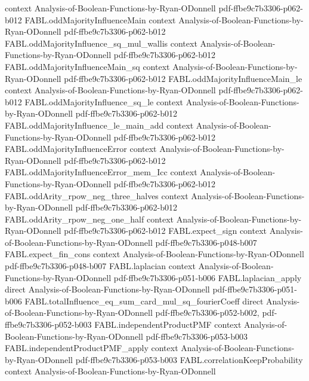 \begin{theorem}
  {context}
  {Analysis-of-Boolean-Functions-by-Ryan-ODonnell}
  {pdf-ffbe9c7b3306-p062-b012}
\proofstep
  {FABL.oddMajorityInfluenceMain}
  {context}
  {Analysis-of-Boolean-Functions-by-Ryan-ODonnell}
  {pdf-ffbe9c7b3306-p062-b012}
\proofstep
  {FABL.oddMajorityInfluence_sq_mul_wallis}
  {context}
  {Analysis-of-Boolean-Functions-by-Ryan-ODonnell}
  {pdf-ffbe9c7b3306-p062-b012}
\proofstep
  {FABL.oddMajorityInfluenceMain_sq}
  {context}
  {Analysis-of-Boolean-Functions-by-Ryan-ODonnell}
  {pdf-ffbe9c7b3306-p062-b012}
\proofstep
  {FABL.oddMajorityInfluenceMain_le}
  {context}
  {Analysis-of-Boolean-Functions-by-Ryan-ODonnell}
  {pdf-ffbe9c7b3306-p062-b012}
\proofstep
  {FABL.oddMajorityInfluence_sq_le}
  {context}
  {Analysis-of-Boolean-Functions-by-Ryan-ODonnell}
  {pdf-ffbe9c7b3306-p062-b012}
\proofstep
  {FABL.oddMajorityInfluence_le_main_add}
  {context}
  {Analysis-of-Boolean-Functions-by-Ryan-ODonnell}
  {pdf-ffbe9c7b3306-p062-b012}
\proofstep
  {FABL.oddMajorityInfluenceError}
  {context}
  {Analysis-of-Boolean-Functions-by-Ryan-ODonnell}
  {pdf-ffbe9c7b3306-p062-b012}
\proofstep
  {FABL.oddMajorityInfluenceError_mem_Icc}
  {context}
  {Analysis-of-Boolean-Functions-by-Ryan-ODonnell}
  {pdf-ffbe9c7b3306-p062-b012}
\proofstep
  {FABL.oddArity_rpow_neg_three_halves}
  {context}
  {Analysis-of-Boolean-Functions-by-Ryan-ODonnell}
  {pdf-ffbe9c7b3306-p062-b012}
\proofstep
  {FABL.oddArity_rpow_neg_one_half}
  {context}
  {Analysis-of-Boolean-Functions-by-Ryan-ODonnell}
  {pdf-ffbe9c7b3306-p062-b012}
\proofstep
  {FABL.expect_sign}
  {context}
  {Analysis-of-Boolean-Functions-by-Ryan-ODonnell}
  {pdf-ffbe9c7b3306-p048-b007}
\proofstep
  {FABL.expect_fin_cons}
  {context}
  {Analysis-of-Boolean-Functions-by-Ryan-ODonnell}
  {pdf-ffbe9c7b3306-p048-b007}
\proofstep
  {FABL.laplacian}
  {context}
  {Analysis-of-Boolean-Functions-by-Ryan-ODonnell}
  {pdf-ffbe9c7b3306-p051-b006}
\proofstep
  {FABL.laplacian_apply}
  {direct}
  {Analysis-of-Boolean-Functions-by-Ryan-ODonnell}
  {pdf-ffbe9c7b3306-p051-b006}
\proofstep
  {FABL.totalInfluence_eq_sum_card_mul_sq_fourierCoeff}
  {direct}
  {Analysis-of-Boolean-Functions-by-Ryan-ODonnell}
  {pdf-ffbe9c7b3306-p052-b002,
    pdf-ffbe9c7b3306-p052-b003}
\proofstep
  {FABL.independentProductPMF}
  {context}
  {Analysis-of-Boolean-Functions-by-Ryan-ODonnell}
  {pdf-ffbe9c7b3306-p053-b003}
\proofstep
  {FABL.independentProductPMF_apply}
  {context}
  {Analysis-of-Boolean-Functions-by-Ryan-ODonnell}
  {pdf-ffbe9c7b3306-p053-b003}
\proofstep
  {FABL.correlationKeepProbability}
  {context}
  {Analysis-of-Boolean-Functions-by-Ryan-ODonnell}

\end{theorem}
